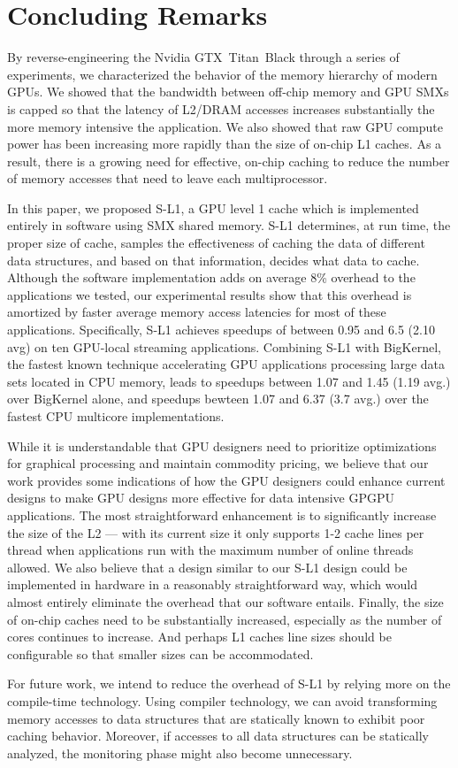\section{Concluding Remarks}
\label{sec:conclusion}

By reverse-engineering the Nvidia GTX~Titan~Black through a series of experiments, we characterized the behavior of the memory hierarchy of modern GPUs.
We showed that the bandwidth between off-chip memory and GPU SMXs is capped so that the latency of L2/DRAM accesses increases substantially the more memory intensive the application.
We also showed that raw GPU compute power has been increasing more rapidly than the size of on-chip
L1 caches.
As a result, there is a growing need for effective, on-chip caching to reduce the number of memory
accesses that need to leave each multiprocessor.

In this paper, we proposed S-L1, a GPU level 1 cache which is implemented entirely in software using SMX shared memory.
S-L1 determines, at run time, the proper size of cache, samples the effectiveness of caching the data of different data structures, and based on that information, decides what data to cache.
Although the software implementation adds on average 8\% overhead to the applications we tested, our experimental results show that this overhead is amortized by faster average memory access latencies for most of these applications.
Specifically, S-L1 achieves speedups of between 0.95 and 6.5 (2.10 avg) on ten GPU-local streaming applications.
Combining S-L1 with BigKernel, the fastest known technique accelerating GPU applications processing
large data sets located in CPU memory, leads to speedups between 1.07 and 1.45 (1.19 avg.) over
BigKernel alone, and speedups bewteen 1.07 and 6.37 (3.7 avg.) over the fastest CPU multicore implementations.

While it is understandable that GPU designers need to prioritize optimizations for graphical
processing and maintain commodity pricing, we believe that our work provides some indications of how
the GPU designers could enhance current designs to make GPU designs more effective for data
intensive GPGPU applications.
The most straightforward enhancement is to significantly increase the size of the L2 --- with its current size it only supports 1-2 cache lines per thread when applications run with the maximum number of online threads allowed.
We also believe that a design similar to our S-L1 design could be implemented in hardware in a
reasonably straightforward way, which would almost entirely eliminate the overhead that our software entails.
Finally, the size of on-chip caches need to be substantially increased, especially as the number of cores continues to increase.
And perhaps L1 caches line sizes should be configurable so that smaller sizes can be accommodated.

For future work,  we intend to reduce the overhead of S-L1 by relying more on the compile-time technology. 
Using compiler technology, we can avoid transforming memory accesses to data structures that are statically known to exhibit poor caching behavior. 
Moreover, if accesses to all data structures can be statically analyzed, the monitoring phase might also become unnecessary.

